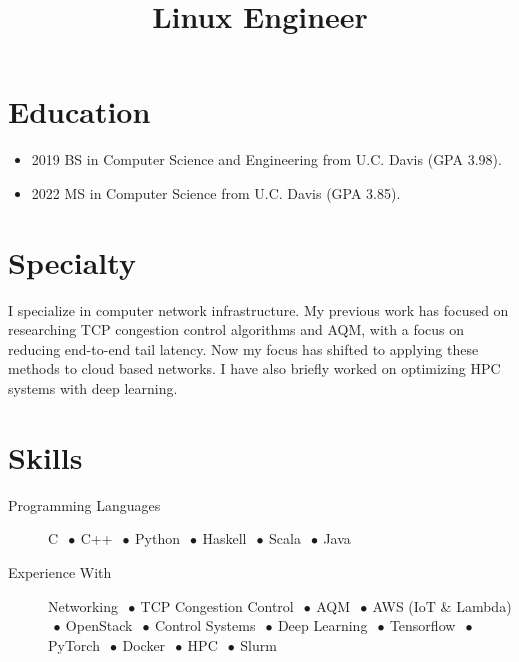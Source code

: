 \documentclass[11pt,a4paper]{moderncv}
\title{Linux Engineer}
\newcommand{\sep}{$~\bullet~$}
\begin{document}
\maketitle

\section*{Education}

\begin{itemize}
\item 2019 BS in Computer Science and Engineering from U.C. Davis
  (GPA 3.98).

\item 2022 MS in Computer Science from U.C. Davis (GPA 3.85).
\end{itemize}


\section*{Specialty}

I specialize in computer network infrastructure.
My previous work has focused on researching TCP congestion control
algorithms and AQM, with a focus on reducing end-to-end tail latency.
Now my focus has shifted to applying these methods to cloud based networks.
I have also briefly worked on optimizing HPC systems with deep learning.


\section*{Skills}

\begin{description}
    \item[Programming Languages]
      C
      \sep C++
      \sep Python
      \sep Haskell
      \sep Scala
      \sep Java

    \item[Experience With]
      Networking
      \sep TCP Congestion Control
      \sep AQM
      \sep AWS (IoT \& Lambda)
      \sep OpenStack
      \sep Control Systems
      \sep Deep Learning
      \sep Tensorflow
      \sep PyTorch
      \sep Docker
      \sep HPC
      \sep Slurm
\end{description}
\end{document}
